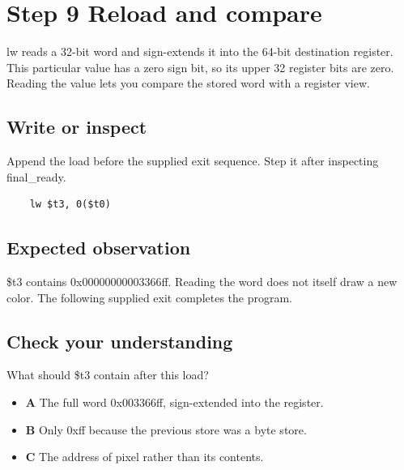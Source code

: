 \section{Step 9 Reload and
  compare}\label{002-single-pixel-s09-step-9-reload-and-compare}

lw reads a 32-bit word and sign-extends it into the 64-bit destination
register. This particular value has a zero sign bit, so its upper 32
register bits are zero. Reading the value lets you compare the stored
word with a register view.

\subsection{Write or
  inspect}\label{002-single-pixel-s09-write-or-inspect}

Append the load before the supplied exit sequence. Step it after
inspecting final\_ready.

\begin{verbatim}
    lw $t3, 0($t0)
\end{verbatim}

\subsection{Expected
  observation}\label{002-single-pixel-s09-expected-observation}

\$t3 contains 0x00000000003366ff. Reading the word does not itself draw
a new color. The following supplied exit completes the program.

\subsection{Check your
  understanding}\label{002-single-pixel-s09-check-your-understanding}

What should \$t3 contain after this load?

\begin{itemize}
  \tightlist
  \item
        \textbf{A} The full word 0x003366ff, sign-extended into the register.
  \item
        \textbf{B} Only 0xff because the previous store was a byte store.
  \item
        \textbf{C} The address of pixel rather than its contents.
\end{itemize}
